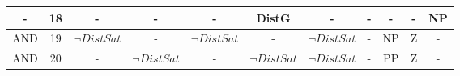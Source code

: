 \begin{table}[ht]
{\begin{tabular}{|c|c|c|c|c|c|c|c|c|c|c|}
-                                                                               & 18                & -              & -              & -              & DistG          & -              & -      & -      & -          & NP         \\ \hline
AND                                                                             & 19                & $\neg DistSat$ & -              & $\neg DistSat$ & -              & $\neg DistSat$ & -      & NP     & Z          & -          \\ \hline
AND                                                                             & 20                & -              & $\neg DistSat$ & -              & $\neg DistSat$ & $\neg DistSat$ & -      & PP     & Z          & -          \\ \hline
\end{tabular}
}
\end{table}